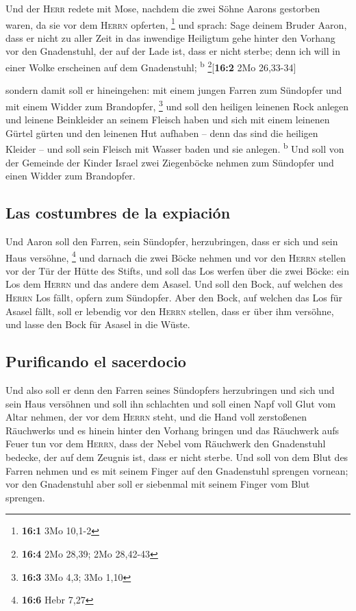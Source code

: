  Und der \textsc{Herr} redete mit Mose, nachdem die zwei
Söhne Aarons gestorben waren, da sie vor dem \textsc{Herrn} opferten,
\footnote{\textbf{16:1} 3Mo 10,1-2}  und sprach: Sage
deinem Bruder Aaron, dass er nicht zu aller Zeit in das inwendige
Heiligtum gehe hinter den Vorhang vor den Gnadenstuhl, der auf der Lade
ist, dass er nicht sterbe; denn ich will in einer Wolke erscheinen auf
dem Gnadenstuhl; \textsuperscript{b} \footnote{\textbf{16:4} 2Mo 28,39;
  2Mo 28,42-43}{[}\textbf{16:2} 2Mo 26,33-34{]}

 sondern damit soll er hineingehen: mit einem jungen
Farren zum Sündopfer und mit einem Widder zum Brandopfer, \footnote{\textbf{16:3}
  3Mo 4,3; 3Mo 1,10}  und soll den heiligen leinenen Rock
anlegen und leinene Beinkleider an seinem Fleisch haben und sich mit
einem leinenen Gürtel gürten und den leinenen Hut aufhaben -- denn das
sind die heiligen Kleider -- und soll sein Fleisch mit Wasser baden und
sie anlegen. \textsuperscript{b}  Und soll von der
Gemeinde der Kinder Israel zwei Ziegenböcke nehmen zum Sündopfer und
einen Widder zum Brandopfer.

\hypertarget{las-costumbres-de-la-expiaciuxf3n}{%
\subsection{Las costumbres de la
expiación}\label{las-costumbres-de-la-expiaciuxf3n}}

 Und Aaron soll den Farren, sein Sündopfer, herzubringen,
dass er sich und sein Haus versöhne, \footnote{\textbf{16:6} Hebr 7,27}
 und darnach die zwei Böcke nehmen und vor den
\textsc{Herrn} stellen vor der Tür der Hütte des Stifts, 
und soll das Los werfen über die zwei Böcke: ein Los dem \textsc{Herrn}
und das andere dem Asasel.  Und soll den Bock, auf welchen
des \textsc{Herrn} Los fällt, opfern zum Sündopfer.  Aber
den Bock, auf welchen das Los für Asasel fällt, soll er lebendig vor den
\textsc{Herrn} stellen, dass er über ihm versöhne, und lasse den Bock
für Asasel in die Wüste.

\hypertarget{purificando-el-sacerdocio}{%
\subsection{Purificando el sacerdocio}\label{purificando-el-sacerdocio}}

 Und also soll er denn den Farren seines Sündopfers
herzubringen und sich und sein Haus versöhnen und soll ihn schlachten
 und soll einen Napf voll Glut vom Altar nehmen, der vor
dem \textsc{Herrn} steht, und die Hand voll zerstoßenen Räuchwerks und
es hinein hinter den Vorhang bringen  und das Räuchwerk
aufs Feuer tun vor dem \textsc{Herrn}, dass der Nebel vom Räuchwerk den
Gnadenstuhl bedecke, der auf dem Zeugnis ist, dass er nicht sterbe.
 Und soll von dem Blut des Farren nehmen und es mit
seinem Finger auf den Gnadenstuhl sprengen vornean; vor den Gnadenstuhl
aber soll er siebenmal mit seinem Finger vom Blut sprengen.

